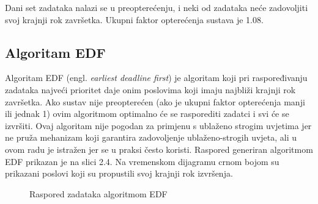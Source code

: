 \documentclass[../zavrsni.tex]{subfiles}
\begin{document}
Dani set zadataka nalazi se u preopterećenju, i neki od zadataka neće zadovoljiti svoj krajnji rok završetka. Ukupni faktor opterećenja
sustava je 1.08.

\subsection{Algoritam EDF}

Algoritam EDF (engl. \textit{earliest deadline first}) je algoritam koji pri raspoređivanju zadataka najveći prioritet daje onim poslovima 
koji imaju najbliži krajnji rok završetka. 
Ako sustav nije preopterećen (ako je ukupni faktor opterećenja manji ili jednak 1) 
ovim algoritmom optimalno će se rasporediti zadatci i svi će se izvršiti. Ovaj algoritam nije pogodan za primjenu s ublaženo strogim uvjetima 
jer ne pruža mehanizam koji garantira zadovoljenje ublaženo-strogih uvjeta,  
ali u ovom radu je istražen jer se u praksi često koristi. 
Raspored generiran algoritmom EDF prikazan je na slici 2.4.
Na vremenskom dijagramu crnom bojom su prikazani poslovi koji su propustili svoj krajnji rok izvršenja.

\begin{figure}[h!]
    \centering

    \begin{RTGrid}[width=13cm]{3}{24}

  

  

  

    \end{RTGrid}

    \caption{Raspored zadataka algoritmom EDF}
    \label{fig:ex1}
  \end{figure}
\end{document}
